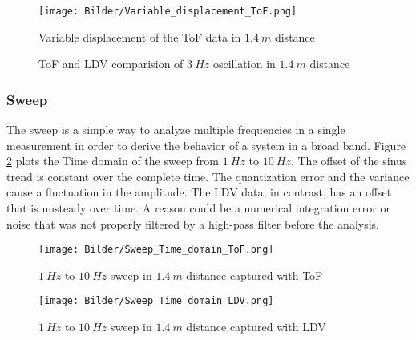\begin{figure}[!h]  
	\centering
	\texttt{[image: Bilder/Variable\_displacement\_ToF.png]}
	\caption{Variable displacement of the ToF data in $1.4~m$ distance}
	\label{fig:Variable_displacement_ToF}
\end{figure}

\begin{figure}[!h]
	\hfill
	\centering
	\caption{ToF and LDV comparision of $3~Hz$ oscillation in $1.4~m$ distance}
\end{figure}
\newpage 

\subsubsection{Sweep}
The sweep is a simple way to analyze multiple frequencies in a single measurement in order to derive the behavior of a system in a broad band. Figure \ref{fig:Time_domain_Sweep_ToF} plots the Time domain of the sweep from $1~Hz$ to $10~Hz$. The offset of the sinus trend is constant over the complete time. The quantization error and the variance cause a fluctuation in the amplitude. The LDV data, in contrast, has an offset that is unsteady over time. A reason could be a numerical integration error or noise that was not properly filtered by a high-pass filter before the analysis.  


\begin{figure}[!h]  
	\centering
	\texttt{[image: Bilder/Sweep\_Time\_domain\_ToF.png]}
	\caption{$1~Hz$ to $10~Hz$ sweep in $1.4~m$ distance captured with ToF}
	\label{fig:Time_domain_Sweep_ToF}
\end{figure}

\begin{figure}[!h]  
	\centering
	\texttt{[image: Bilder/Sweep\_Time\_domain\_LDV.png]}
	\caption{$1~Hz$ to $10~Hz$ sweep in $1.4~m$ distance captured with LDV}
	\label{fig:Time_domain_Sweep_LDV}
\end{figure}

